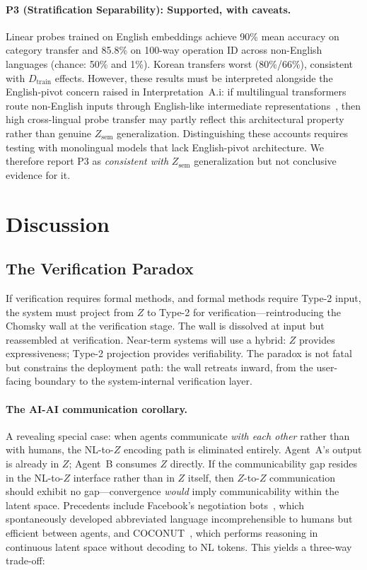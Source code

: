 \documentclass{article}
\theoremstyle{definition}
\newcommand{\Zsem}{Z_{\text{sem}}}
\newcommand{\Dtrain}{D_{\text{train}}}
\begin{document}
\paragraph{P3 (Stratification Separability): Supported, with caveats.}
Linear probes trained on English embeddings achieve 90\% mean accuracy on category transfer and 85.8\% on 100-way operation ID across non-English languages (chance: 50\% and 1\%). Korean transfers worst (80\%/66\%), consistent with $\Dtrain$ effects. However, these results must be interpreted alongside the English-pivot concern raised in Interpretation~A.i: if multilingual transformers route non-English inputs through English-like intermediate representations~\citep{wendler2024llamas}, then high cross-lingual probe transfer may partly reflect this architectural property rather than genuine $\Zsem$ generalization. Distinguishing these accounts requires testing with monolingual models that lack English-pivot architecture. We therefore report P3 as \emph{consistent with} $\Zsem$ generalization but not conclusive evidence for it.


\section{Discussion}

\subsection{The Verification Paradox}\label{sec:verification}

If verification requires formal methods, and formal methods require Type-2 input, the system must project from $Z$ to Type-2 for verification---reintroducing the Chomsky wall at the verification stage. The wall is dissolved at input but reassembled at verification. Near-term systems will use a hybrid: $Z$ provides expressiveness; Type-2 projection provides verifiability. The paradox is not fatal but constrains the deployment path: the wall retreats inward, from the user-facing boundary to the system-internal verification layer.

\paragraph{The AI-AI communication corollary.}
A revealing special case: when agents communicate \emph{with each other} rather than with humans, the NL-to-$Z$ encoding path is eliminated entirely. Agent~A's output is already in $Z$; Agent~B consumes $Z$ directly. If the communicability gap resides in the NL-to-$Z$ interface rather than in $Z$ itself, then $Z$-to-$Z$ communication should exhibit no gap---convergence \emph{would} imply communicability within the latent space. Precedents include Facebook's negotiation bots~\citep{lewis2017negotiation}, which spontaneously developed abbreviated language incomprehensible to humans but efficient between agents, and COCONUT~\citep{hao2024coconut}, which performs reasoning in continuous latent space without decoding to NL tokens. This yields a three-way trade-off:
\end{document}
